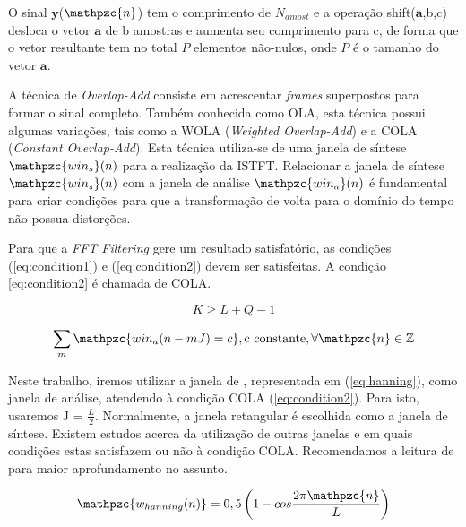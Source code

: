         O sinal $\mathbf{y}$($\mathpzc{n}$) tem o comprimento de $N_{amost}$ e a operação shift($\mathbf{a}$,b,c) desloca o vetor $\mathbf{a}$ de b amostras e aumenta seu comprimento para c, de forma que o vetor resultante tem no total $P$ elementos não-nulos, onde $P$ é o tamanho do vetor $\mathbf{a}$.
        
        A técnica de \textit{Overlap-Add} consiste em acrescentar \textit{frames} superpostos para formar o sinal completo. Também conhecida como OLA, esta técnica possui algumas variações, tais como a WOLA (\textit{Weighted Overlap-Add}) e a COLA (\textit{Constant Overlap-Add}). Esta técnica utiliza-se de uma janela de síntese $\mathpzc{win_s}(n)$ para a realização da ISTFT. Relacionar a janela de síntese $\mathpzc{win_s}(n)$ com a janela de análise $\mathpzc{win_a}(n)$ é fundamental para criar condições para que a transformação de volta para o domínio do tempo não possua distorções. 
        
        Para que a \textit{FFT Filtering} gere um resultado satisfatório, as condições (\ref{eq:condition1}) e (\ref{eq:condition2}) devem ser satisfeitas. A condição \ref{eq:condition2} é chamada de COLA.
        
        \begin{equation}\label{eq:condition1}
            K \geq L + Q - 1
        \end{equation}
        
        \begin{equation}\label{eq:condition2}
            \sum_m \mathpzc{win_a(n - mJ) = c},\text{c constante}, \forall\mathpzc{n} \in \mathbb{Z}
        \end{equation}
 
        
        Neste trabalho, iremos utilizar a janela de , representada em (\ref{eq:hanning}), como janela de análise, atendendo à condição COLA (\ref{eq:condition2}). Para isto, usaremos J = $\frac{L}{2}$. Normalmente, a janela retangular é escolhida como a janela de síntese. Existem estudos acerca da utilização de outras janelas e em quais condições estas satisfazem ou não à condição COLA. Recomendamos a leitura de \cite{LuizVictorio} para maior aprofundamento no assunto.
        
        \begin{equation}\label{eq:hanning}
            \mathpzc{w_{hanning}(n)} = 0,5 \left( 1 - cos\frac{2\pi\mathpzc{n}}{L}\right)
        \end{equation}
        
